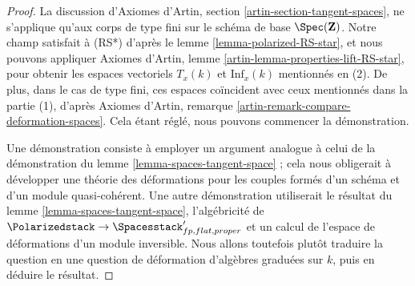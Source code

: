 \begin{proof}
La discussion d'Axiomes d'Artin, section \ref{artin-section-tangent-spaces},
ne s'applique qu'aux corps de type fini sur le schéma de base
$\Spec(\mathbf{Z})$. Notre champ satisfait à (RS*) d'après le
lemme \ref{lemma-polarized-RS-star}, et nous pouvons appliquer
Axiomes d'Artin, lemme \ref{artin-lemma-properties-lift-RS-star},
pour obtenir les espaces vectoriels $T_x(k)$ et $\text{Inf}_x(k)$ mentionnés en
(2). De plus, dans le cas de type fini, ces espaces coïncident avec ceux
mentionnés dans la partie (1), d'après Axiomes d'Artin, remarque
\ref{artin-remark-compare-deformation-spaces}.
Cela étant réglé, nous pouvons commencer la démonstration.

\medskip\noindent
Une démonstration consiste à employer un argument analogue à celui de la
démonstration du lemme \ref{lemma-spaces-tangent-space} ; cela nous obligerait
à développer une théorie des déformations pour les couples formés d'un schéma
et d'un module quasi-cohérent.
Une autre démonstration utiliserait le résultat du
lemme \ref{lemma-spaces-tangent-space}, l'algébricité de
$\Polarizedstack \to \Spacesstack'_{fp, flat, proper}$ et un calcul de l'espace
de déformations d'un module inversible. Nous allons toutefois plutôt traduire
la question en une question de déformation d'algèbres graduées sur $k$, puis en
déduire le résultat.


\end{proof}

